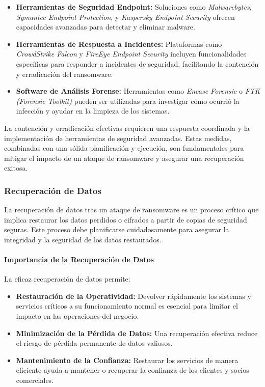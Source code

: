 \begin{itemize}
    \item \textbf{Herramientas de Seguridad Endpoint:} Soluciones como \textit{Malwarebytes}, \textit{Symantec Endpoint Protection}, y \textit{Kaspersky Endpoint Security} ofrecen capacidades avanzadas para detectar y eliminar malware.
    \item \textbf{Herramientas de Respuesta a Incidentes:} Plataformas como \textit{CrowdStrike Falcon} y \textit{FireEye Endpoint Security} incluyen funcionalidades específicas para responder a incidentes de seguridad, facilitando la contención y erradicación del ransomware.
    \item \textbf{Software de Análisis Forense:} Herramientas como \textit{Encase Forensic} o \textit{FTK (Forensic Toolkit)} pueden ser utilizadas para investigar cómo ocurrió la infección y ayudar en la limpieza de los sistemas.
\end{itemize}

La contención y erradicación efectivas requieren una respuesta coordinada y la implementación de herramientas de seguridad avanzadas. Estas medidas, combinadas con una sólida planificación y ejecución, son fundamentales para mitigar el impacto de un ataque de ransomware y asegurar una recuperación exitosa.


\subsubsection{Recuperación de Datos}

La recuperación de datos tras un ataque de ransomware es un proceso crítico que implica restaurar los datos perdidos o cifrados a partir de copias de seguridad seguras. Este proceso debe planificarse cuidadosamente para asegurar la integridad y la seguridad de los datos restaurados.

\paragraph{Importancia de la Recuperación de Datos}

La eficaz recuperación de datos permite:

\begin{itemize}
    \item \textbf{Restauración de la Operatividad:} Devolver rápidamente los sistemas y servicios críticos a su funcionamiento normal es esencial para limitar el impacto en las operaciones del negocio.
    \item \textbf{Minimización de la Pérdida de Datos:} Una recuperación efectiva reduce el riesgo de pérdida permanente de datos valiosos.
    \item \textbf{Mantenimiento de la Confianza:} Restaurar los servicios de manera eficiente ayuda a mantener o recuperar la confianza de los clientes y socios comerciales.
\end{itemize}

